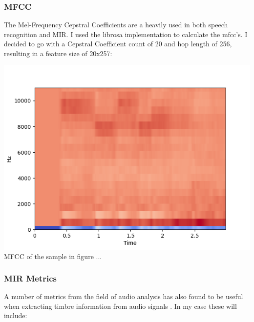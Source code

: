 \documentclass[11pt]{article}
\begin{document}
\subsubsection{MFCC}
\label{sec:orgcdd670a}

The Mel-Frequency Cepstral Coefficients are a heavily used in both speech recognition and MIR. \cite{medium,klustr,Racharla_2020,article}
I used the librosa implementation to calculate the mfcc's. I decided to go with a Cepstral Coefficient count of 20 and hop length of 256, resulting in a feature size of 20x257:

\begin{center}
\includegraphics[width=.9\linewidth]{./Figures/mfcc.png}
MFCC of the sample in figure ...
\end{center}

\subsubsection{MIR Metrics}
\label{sec:orgc209c9e}

A number of metrics from the field of audio analysis has also found to be useful when extracting timbre information from audio signals \cite{article,klustr}. In my case these will include:
\end{document}
